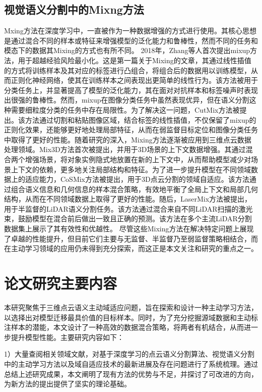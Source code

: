 \subsection{视觉语义分割中的Mixng方法}
Mxing方法在深度学习中，一直被作为一种数据增强的方式进行使用。其核心思想是通过混合不同的样本或特征来增强模型的泛化能力和鲁棒性，然而不同的任务和模态下的数据其Mixing的方式也有所不同。
2018年，Zhang等人首次提出mixup方法，用于超越经验风险最小化。这是第一篇关于Mixing的文章，其通过线性插值的方式将训练样本及其对应的标签进行凸组合，将组合后的数据用以训练模型，从而正则化神经网络，使其在训练样本之间表现出更简单的线性行为。该方法被用于分类任务上，并显著提高了模型的泛化能力，其在面对对抗样本和标签噪声时表现出很强的鲁棒性。然而，mixup在图像分类任务中虽然表现优异，但在语义分割这种需要细粒度分类的任务中存在局限性。为了解决这一问题，CutMix方法被提出。该方法通过切割和粘贴图像区域，结合标签的线性插值，不仅保留了mixup的正则化效果，还能够更好地处理局部特征，从而在弱监督目标定位和图像分类任务中取得了更好的性能。随着研究的深入，Mixing方法逐渐被应用到三维点云数据处理领域。Mix3D方法首次被提出，并用于3D场景的上下文数据增强。其通过混合两个增强场景，将对象实例隐式地放置在新的上下文中，从而帮助模型减少对场景上下文的依赖，更多地关注局部结构和特征。为了进一步提升模型在不同领域数据上的适应能力，CoSMix方法被提出，用于3D点云分割的领域自适应。该方法通过组合语义信息和几何信息的样本混合策略，有效地平衡了全局上下文和局部几何结构，从而在不同领域数据上取得了更好的性能。随后，LaserMix方法被提出，用于半监督的LiDAR语义分割任务。该方法通过混合来自不同LiDAR扫描的激光束，鼓励模型在混合前后做出一致且正确的预测。该方法在多个主流LiDAR分割数据集上展示了其有效性和优越性。
尽管这些Mixing方法在解决特定问题上展现了卓越的性能提升，但目前它们主要与无监督、半监督乃至弱监督策略相结合，而在主动学习领域的应用仍未得到充分探索，而这正是本文关注和研究的重点之一。

\section{论文研究主要内容}
本研究聚焦于三维点云语义主动域适应问题，旨在探索和设计一种主动学习方法，以选择出对模型迁移最具价值的目标样本。同时，为了充分挖掘源域数据和主动标注样本的潜能，本文设计了一种高效的数据混合策略，将两者有机结合，从而进一步提升模型性能。主要研究内容如下：

1）大量查阅相关领域文献，对基于深度学习的点云语义分割算法、视觉语义分割中的主动学习方法以及域自适应技术的最新进展及存在问题进行了系统梳理。通过总结上述研究成果，本文阐明了现有方法的优势与不足，并探讨了可改进的方向，为新方法的提出提供了坚实的理论基础。

